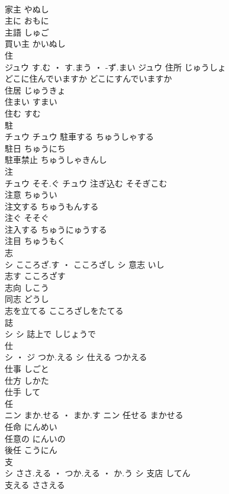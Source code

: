 \documentclass[8pt]{extreport}
\begin{document}
\begin{CJK}{UTF8}{min}
\\	家主	やぬし	
\\	主に	おもに	
\\	主語	しゅご	
\\	買い主	かいぬし	
\\	住	
\\	ジュウ	す.む ・ す.まう ・ -ず.まい	ジュウ	住所	じゅうしょ	
\\	どこに住んでいますか	どこにすんでいますか	
\\	住居	じゅうきょ	
\\	住まい	すまい	
\\	住む	すむ	
\\	駐	
\\	チュウ		チュウ	駐車する	ちゅうしゃする	
\\	駐日	ちゅうにち	
\\	駐車禁止	ちゅうしゃきんし	
\\	注	
\\	チュウ	そそ.ぐ	チュウ	注ぎ込む	そそぎこむ	
\\	注意	ちゅうい	
\\	注文する	ちゅうもんする	
\\	注ぐ	そそぐ	
\\	注入する	ちゅうにゅうする	
\\	注目	ちゅうもく	
\\	志	
\\	シ	こころざ.す ・ こころざし	シ	意志	いし	
\\	志す	こころざす	
\\	志向	しこう	
\\	同志	どうし	
\\	志を立てる	こころざしをたてる	
\\	誌	
\\	シ		シ													誌上で	しじょうで	
\\	仕	
\\	シ ・ ジ	つか.える	シ	仕える	つかえる	
\\	仕事	しごと	
\\	仕方	しかた	
\\	仕手	して	
\\	任	
\\	ニン	まか.せる ・ まか.す	ニン	任せる	まかせる	
\\	任命	にんめい	
\\	任意の	にんいの	
\\	後任	こうにん	
\\	支	
\\	シ	ささ.える ・ つか.える ・ か.う	シ	支店	してん	
\\	支える	ささえる	

\end{CJK}
\end{document}
